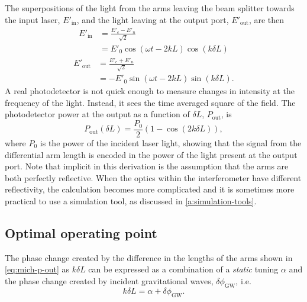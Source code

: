 The superpositions of the light from the arms leaving the beam splitter towards the input laser, $E'_{\text{in}}$, and the light leaving at the output port, $E'_{\text{out}}$, are then
\begin{equation}
  \begin{split}
    E'_{\text{in}} &= \frac{E'_{e} - E'_{n}}{\sqrt{2}} \\
                      &= E'_0 \cos \left( \omega t - 2kL \right) \cos \left( k \delta L \right)
  \end{split}
\end{equation}
\begin{equation}
  \begin{split}
    E'_{\text{out}} &= \frac{E'_{e} + E'_{n}}{\sqrt{2}} \\
                       &= -E'_0 \sin \left( \omega t - 2kL \right) \sin \left( k \delta L \right).
  \end{split}
\end{equation}
A real photodetector is not quick enough to measure changes in intensity at the frequency of the light. Instead, it sees the time averaged square of the field. The photodetector power at the output as a function of $\delta L$, $P_{\text{out}}$, is
\begin{equation}
  \label{eq:mich-p-out}
  P_{\text{out}} \left( \delta L \right) = \frac{P_0}{2} \left( 1 - \cos \left( 2k \delta L \right) \right),
\end{equation}
where $P_0$ is the power of the incident laser light, showing that the signal from the differential arm length is encoded in the power of the light present at the output port. Note that implicit in this derivation is the assumption that the arms are both perfectly reflective. When the optics within the interferometer have different reflectivity, the calculation becomes more complicated and it is sometimes more practical to use a simulation tool, as discussed in \cref{a:simulation-tools}.

\subsection{\label{sec:operating-point}Optimal operating point}
The phase change created by the difference in the lengths of the arms shown in \cref{eq:mich-p-out} as $k \delta L$ can be expressed as a combination of a \emph{static} tuning $\alpha$ and the phase change created by incident gravitational waves, $\delta \phi_{\text{GW}}$, i.e.
\begin{equation}
  k \delta L = \alpha + \delta \phi_{\text{GW}}.
\end{equation}


